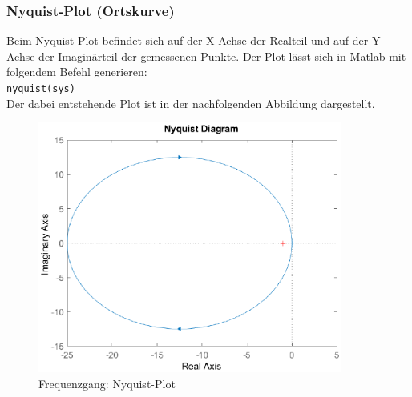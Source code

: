 \subsubsection{Nyquist-Plot (Ortskurve)}
Beim Nyquist-Plot befindet sich auf der X-Achse der Realteil und auf der Y-Achse der Imaginärteil der gemessenen Punkte.
Der Plot lässt sich in Matlab mit folgendem Befehl generieren:\\
\hspace*{0.5cm}\texttt{nyquist(sys)}\\
Der dabei entstehende Plot ist in der nachfolgenden Abbildung dargestellt.
\begin{figure}[H]
    \centering
    \includegraphics[width=10cm]{images_2/Frequenzgang/nyquist.eps}
    \caption{Frequenzgang: Nyquist-Plot}
\end{figure}

